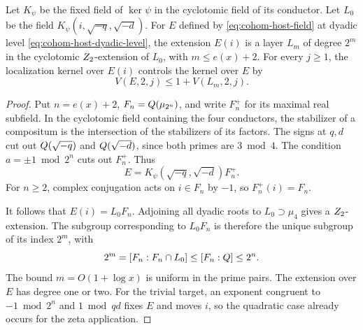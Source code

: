 \begin{lemma}\label{lem:dyadic-host}
Let \(K_\psi\) be the fixed field of \(\ker\psi\) in the
cyclotomic field of its conductor. Let \(L_0\) be the field
\(K_\psi(i,\sqrt{-q},\sqrt{-d})\). For \(E\) defined by
\eqref{eq:cohom-host-field} at dyadic level
\eqref{eq:cohom-host-dyadic-level}, the extension \(E(i)\)
is a layer \(L_m\) of degree \(2^m\) in the cyclotomic
\(Z_2\)-extension of \(L_0\), with \(m\le e(x)+2\).
For every \(j\ge1\), the localization kernel over \(E(i)\)
controls the kernel over \(E\) by
\begin{equation}\label{eq:dyadic-host}
                  V(E,2,j)\le 1+V(L_m,2,j).
\end{equation}
\end{lemma}
\begin{proof}
Put \(n=e(x)+2\), \(F_n=Q(\mu_{2^n})\), and write \(F_n^+\)
for its maximal real subfield. In the cyclotomic field containing
the four conductors, the stabilizer of a compositum is the
intersection of the stabilizers of its factors. The signs at \(q,d\)
cut out \(Q(\sqrt{-q})\) and \(Q(\sqrt{-d})\), since both primes
are \(3\bmod 4\). The condition \(a=\pm1\bmod 2^n\) cuts out
\(F_n^+\). Thus
\[
 E=K_\psi(\sqrt{-q},\sqrt{-d})F_n^+.
\]
For \(n\ge2\), complex conjugation acts on \(i\in F_n\) by
\(-1\), so \(F_n^+(i)=F_n\).

It follows that \(E(i)=L_0 F_n\).
Adjoining all dyadic roots to \(L_0\supset\mu_4\) gives a
\(Z_2\)-extension. The subgroup corresponding to \(L_0F_n\)
is therefore the unique subgroup of its index \(2^m\), with
\[
        2^m=[F_n:F_n\cap L_0]\le[F_n:Q]\le 2^n.
\]
The bound \(m=O(1+\log x)\) is uniform in the prime pairs.
The extension over \(E\) has degree one or two. For the trivial
target, an exponent congruent to \(-1\bmod 2^n\) and
\(1\bmod qd\) fixes \(E\) and moves \(i\), so the quadratic
case already occurs for the zeta application.


\end{proof}
